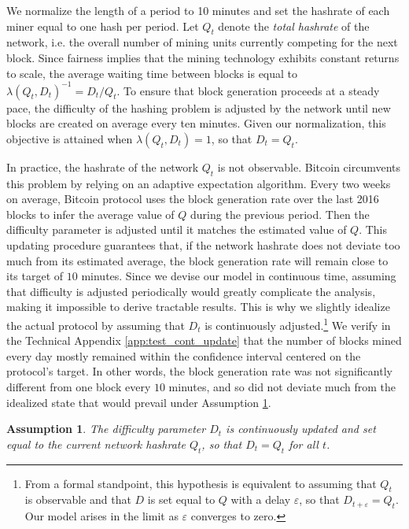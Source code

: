 \documentclass[12pt, a4paper]{article}
\newtheorem{hyp}{Assumption}
\begin{document}
We normalize the length of a period to 10 minutes and set the hashrate of
each miner equal to one hash per period. Let $Q_t$ denote the \emph{total hashrate} of the network,
i.e. the overall number of mining units currently competing for the next block.
Since fairness implies that the mining technology exhibits constant returns to scale, the average
waiting time between blocks is equal to $\lambda(Q_t,D_t)^{-1}=D_t/Q_t$.
To ensure that block generation proceeds at a steady pace, the difficulty of the hashing
problem is adjusted by the network until new blocks are created on average every ten minutes.
Given our normalization, this objective is attained when $\lambda(Q_t,D_t)=1$, so that $D_t=Q_t$.

In practice, the hashrate of the network $Q_t$ is not observable. Bitcoin circumvents this problem
by relying on an adaptive expectation algorithm. Every two weeks on average, Bitcoin protocol uses the block
generation rate over the last 2016 blocks to infer the average value of $Q$ during the previous period.
Then the difficulty parameter is adjusted until it matches the estimated value of $Q$. This updating
procedure guarantees that, if the network hashrate does not deviate too much from its estimated average,
the block generation rate will remain close to its target of $10$ minutes.
Since we devise our model in continuous time, assuming that difficulty is
adjusted periodically would greatly complicate the analysis, making it impossible to derive tractable results.
This is why we
slightly idealize the actual protocol by assuming that
$D_t$ is continuously adjusted.\footnote{From a formal standpoint, this hypothesis is equivalent to assuming that
$Q_t$ is observable and that $D$ is set equal to $Q$ with a delay $\varepsilon$, so that $D_{t+\varepsilon}=Q_t$.
Our model arises in the limit as $\varepsilon$ converges to zero.}
We verify in the Technical Appendix \ref{app:test_cont_update} that
the number of blocks mined every day mostly remained within the confidence
interval centered on the protocol's target. In other words, the block generation rate
was not significantly different from one block every $10$ minutes, and so did not
deviate much from the idealized state that would prevail
under Assumption \ref{hyp:continuous_update}.

\begin{hyp}
\label{hyp:continuous_update} The difficulty parameter $D_t$ is
continuously updated and set equal to the current network hashrate $Q_t$, so that $%
D_t=Q_t$ for all $t$.
\end{hyp}
\end{document}
